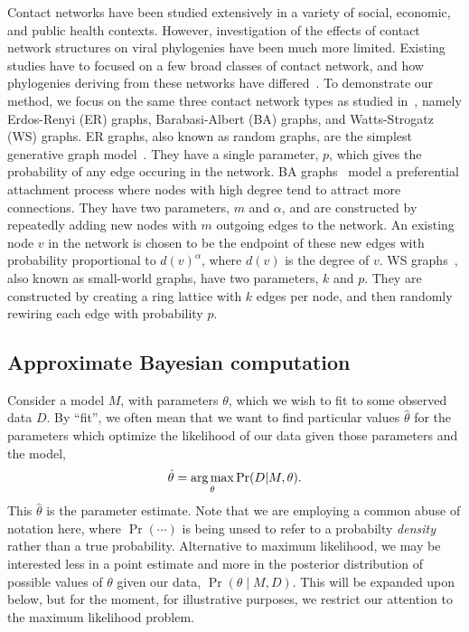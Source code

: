 Contact networks have been studied extensively in a variety of social,
economic, and public health contexts. However, investigation of the effects of
contact network structures on viral phylogenies have been much more limited.
Existing studies have to focused on a few broad classes of contact network, and
how phylogenies deriving from these networks have
differed~\autocite{leventhal2012inferring, colijn2014phylogenetic,
robinson2013dynamics}. To demonstrate our method, we focus on the same three
contact network types as studied in~\autocite{leventhal2012inferring}, namely
Erdos-Renyi (ER) graphs, Barabasi-Albert (BA) graphs, and Watts-Strogatz (WS)
graphs. ER graphs, also known as random graphs, are the simplest generative
graph model~\autocite{erdos1960evolution}. They have a single parameter, $p$,
which gives the probability of any edge occuring in the network. BA
graphs~\autocite{barabasi1999emergence} model a preferential attachment process
where nodes with high degree tend to attract more connections. They have two
parameters, $m$ and $\alpha$, and are constructed by repeatedly adding new
nodes with $m$ outgoing edges to the network. An existing node $v$ in the
network is chosen to be the endpoint of these new edges with probability
proportional to $d(v)^\alpha$, where $d(v)$ is the degree of $v$. WS
graphs~\autocite{watts1998collective}, also known as small-world graphs, have
two parameters, $k$ and $p$. They are constructed by creating a ring lattice
with $k$ edges per node, and then randomly rewiring each edge with probability
$p$.

\subsection{Approximate Bayesian computation}

Consider a model $M$, with parameters $\theta$, which we wish to fit to some
observed data $D$. By ``fit'', we often mean that we want to find particular
values $\hat{\theta}$ for the parameters which optimize the likelihood of our
data given those parameters and the model,
\[
  \hat{\theta} = \operatorname*{arg\,max}_\theta \Pr(D | M, \theta).
\]
This $\hat{\theta}$ is the  parameter estimate. Note
that we are employing a common abuse of notation here, where $\Pr(\cdots)$ is
being unsed to refer to a probabilty \emph{density} rather than a true
probability. Alternative to maximum likelihood, we may be interested less in a
point estimate and more in the posterior distribution of possible values of
$\theta$ given our data, $\Pr(\theta \mid M, D)$. This will be expanded upon
below, but for the moment, for illustrative purposes, we restrict our attention
to the maximum likelihood problem.

